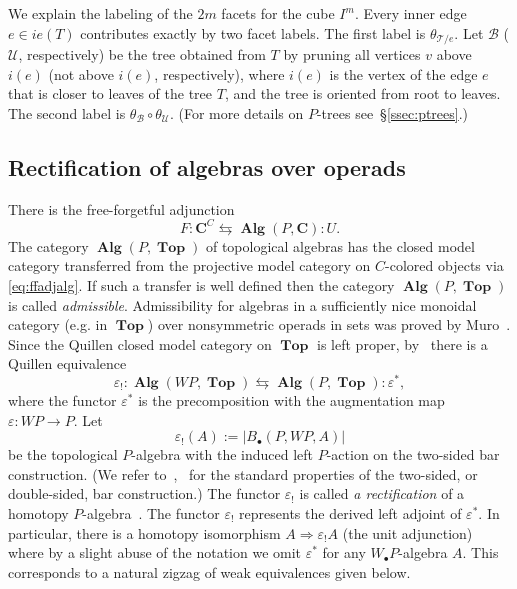 \documentclass{amsart}
\theoremstyle{definition}
\theoremstyle{remark}
\newcommand{\eps}{\varepsilon}
\newcommand{\Cc}{\mathbf{C}}
\DeclareMathOperator{\Top}{\mathbf{Top}}
\DeclareMathOperator{\Alg}{\mathbf{Alg}}
\newcommand{\rcolon}{\mathrel{}\colon\!}
\begin{document}
	We explain the labeling of the $2m$ facets for the cube $I^{m}$.
	Every inner edge $e\in ie(T)$ contributes exactly by two facet labels.
	The first label is $\theta_{\mathcal{T}/e}$.
	Let $\mathcal{B}$ ($\mathcal{U}$, respectively) be the tree obtained from $T$ by pruning all vertices $v$ above $i(e)$ (not above $i(e)$, respectively), where $i(e)$ is the vertex of the edge $e$ that is closer to leaves of the tree $T$, and the tree is oriented from root to leaves.
	The second label is $\theta_{\mathcal{B}}\circ \theta_{\mathcal{U}}$.
	(For more details on $P$-trees see~\S\ref{ssec:ptrees}.)
	
	\subsection{Rectification of algebras over operads}\label{ssec:rectif}
	
	There is the free-forgetful adjunction
	\begin{equation}\label{eq:ffadjalg}
		F\colon \Cc^{C}\leftrightarrows \Alg(P,\Cc) \rcolon U.
	\end{equation}
	The category $\Alg(P,\Top)$ of topological algebras has the closed model category transferred from the projective model category on $C$-colored objects via \eqref{eq:ffadjalg}.
	If such a transfer is well defined then the category $\Alg(P,\Top)$ is called \emph{admissible}.
	Admissibility for algebras in a sufficiently nice monoidal category (e.g. in $\Top$) over nonsymmetric operads in sets was proved by Muro~\cite{mu-11}.
	Since the Quillen closed model category on $\Top$ is left proper, by~\cite[Theorem~1.5]{mu-11} there is a Quillen equivalence
	\[
	\eps_{!}\colon \Alg(W P,\Top)\leftrightarrows
	\Alg(P,\Top)\rcolon \eps^{*},
	\]
	where the functor $\eps^{*}$ is the precomposition with the augmentation map $\eps\colon WP\to P$.
	Let 
	\[
	\eps_{!}(A):=|B_{\bullet}(P,WP,A)|
	\]
	be the topological $P$-algebra with the induced left $P$-action on the two-sided bar construction.
	(We refer to~\cite{ri-14},~\cite{be-mo-06'} for the standard properties of the two-sided, or double-sided, bar construction.)
	The functor $\eps_{!}$ is called \textit{a rectification} of a homotopy $P$-algebra~\cite{be-mo-06}.
	The functor $\eps_{!}$ represents the derived left adjoint of $\eps^{*}$.
	In particular, there is a homotopy isomorphism $A\Rightarrow \eps_{!}A$ (the unit adjunction) where by a slight abuse of the notation we omit $\eps^{*}$ for any $W_{\bullet}P$-algebra $A$.
	This corresponds to a natural zigzag of weak equivalences given below.
	
\end{document}
